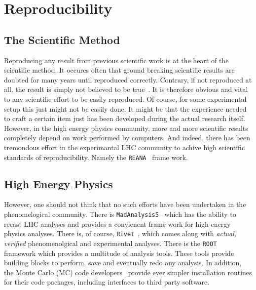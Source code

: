 
\section{Reproducibility}

\subsection{The Scientific Method}
Reproducing any result from previous scientific work is at the heart
of the scientific method. It occures often that ground breaking
scientific results are doubted for many years until reproduced
correctly. Contrary, if not reproduced at all, the result is simply
not believed to be true~\cite{}. It is therefore obvious and vital to
any scientific effort to be easily reproduced. Of course, for some
experimental setup this just might not be easily done. It might be
that the experience needed to craft a certain item just has been
developed during the actual research itself. However, in the high
energy physics community, more and more scientific results completely
depend on work performed by computers. And indeed, there has been
tremondous effort in the experimantal LHC community to achive high
scientific standards of reproducibility. Namely the
\texttt{REANA}~\cite{} frame work.

\subsection{High Energy Physics}
However, one should not think that no such efforts have been
undertaken in the phenomelogical community. There is
\texttt{MadAnalysis5}~\cite{} which has the ability to recast LHC
analyses and provides a convienent frame work for high energy physics
analyses. There is, of course, \texttt{Rivet}~\cite{}, which comes
along with \emph{actual, verified} phenomenolgical and experimental
analyses. There is the \texttt{ROOT}~\cite{} framework which provides
a multitude of analysis tools. These tools provide building blocks to
perform, save and eventually redo any analysis. In addition, the Monte
Carlo (MC) code developers~\cite{} provide ever simpler installation
routines for their code packages, including interfaces to third party
software.

